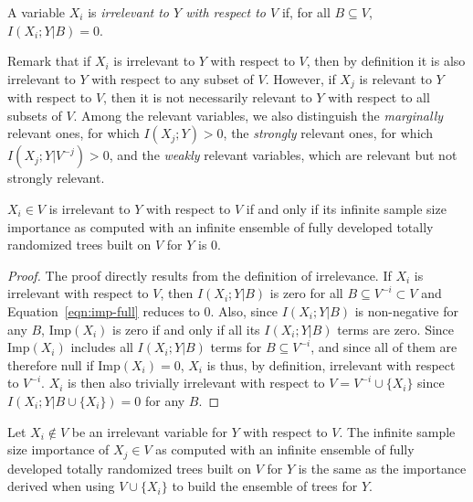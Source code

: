 \begin{definition} A variable $X_i$ is {\em
irrelevant to $Y$ with respect to $V$} if, for all $B
\subseteq V$, $I(X_i; Y|B)=0$.
\end{definition}

Remark that if $X_i$ is irrelevant to $Y$ with
respect to $V$, then by definition it is also irrelevant to $Y$ with respect to
any subset of $V$. However, if $X_j$ is relevant to $Y$ with respect to $V$,
then it is not necessarily relevant to $Y$ with respect to all  subsets of $V$.
Among the relevant variables, we also distinguish the {\em marginally} relevant
ones, for which $I(X_{j}; Y) > 0$, the  {\em strongly} relevant ones, for which
$I(X_{j}; Y | V^{-j}) > 0$,  and the {\em weakly} relevant variables, which are
relevant but not strongly relevant.

\begin{theorem}\label{thm:irrelevant}
  $X_i \in V$ is irrelevant to $Y$ with respect to $V$ if and only if  its
  infinite sample size importance as computed with an infinite ensemble of fully
  developed totally randomized trees built on $V$ for $Y$ is $0$.
\end{theorem}

\begin{proof}
The proof directly results from the definition of irrelevance. If $X_i$ is
irrelevant with respect to $V$, then $I(X_i;Y|B)$ is zero for all $B \subseteq
V^{-i} \subset V$ and Equation~\ref{eqn:imp-full} reduces to $0$. Also, since
$I(X_i;Y|B)$ is non-negative for any $B$, $\text{Imp}(X_i)$ is zero if and only if all
its $I(X_i;Y|B)$ terms are zero. Since $\text{Imp}(X_i)$ includes all $I(X_i;Y|B)$
terms for $B \subseteq V^{-i}$, and since all of them are therefore null if
$\text{Imp}(X_i)=0$,  $X_i$ is thus, by definition, irrelevant with respect to
$V^{-i}$. $X_i$ is then also trivially irrelevant with respect to $V=V^{-i} \cup
\{X_i\}$ since $I(X_i;Y|B\cup\{X_i\})=0$ for any $B$.
\end{proof}

\begin{lemma}\label{lemma:adding-irrelevant}
  Let $X_i \notin V$ be an irrelevant variable for $Y$ with respect to $V$. The infinite
  sample size importance of $X_j \in V$ as computed with an infinite
  ensemble of fully developed totally randomized trees built on $V$ for $Y$ is the
  same as the importance derived when using $V\cup \{X_i\}$ to build the ensemble of trees for $Y$.
\end{lemma}

